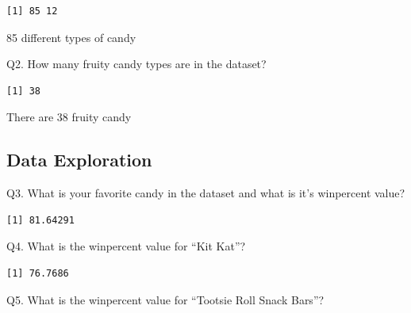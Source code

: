 \documentclass[
  letterpaper,
  DIV=11,
  numbers=noendperiod]{scrartcl}
\newenvironment{Shaded}{\begin{snugshade}}{\end{snugshade}}
\newcommand{\FunctionTok}[1]{\textcolor[rgb]{0.28,0.35,0.67}{#1}}
\newcommand{\NormalTok}[1]{\textcolor[rgb]{0.00,0.23,0.31}{#1}}
\newcommand{\SpecialCharTok}[1]{\textcolor[rgb]{0.37,0.37,0.37}{#1}}
\newcommand{\StringTok}[1]{\textcolor[rgb]{0.13,0.47,0.30}{#1}}
\begin{document}
\begin{verbatim}
[1] 85 12
\end{verbatim}

85 different types of candy

Q2. How many fruity candy types are in the dataset?

\begin{Shaded}
\end{Shaded}

\begin{verbatim}
[1] 38
\end{verbatim}

There are 38 fruity candy

\hypertarget{data-exploration}{%
\subsection{Data Exploration}\label{data-exploration}}

Q3. What is your favorite candy in the dataset and what is it's
winpercent value?

\begin{Shaded}
\end{Shaded}

\begin{verbatim}
[1] 81.64291
\end{verbatim}

Q4. What is the winpercent value for ``Kit Kat''?

\begin{Shaded}
\end{Shaded}

\begin{verbatim}
[1] 76.7686
\end{verbatim}

Q5. What is the winpercent value for ``Tootsie Roll Snack Bars''?

\begin{Shaded}
\end{Shaded}
\end{document}
